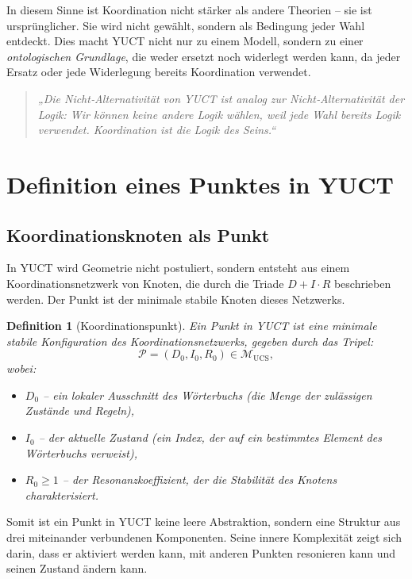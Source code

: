 \documentclass[12pt,a4paper]{article}
\newtheorem{definition}{Definition}
\newcommand{\calP}{\mathcal{P}}
\begin{document}
	In diesem Sinne ist Koordination nicht stärker als andere Theorien – sie ist ursprünglicher. Sie wird nicht gewählt, sondern als Bedingung jeder Wahl entdeckt. Dies macht YUCT nicht nur zu einem Modell, sondern zu einer \emph{ontologischen Grundlage}, die weder ersetzt noch widerlegt werden kann, da jeder Ersatz oder jede Widerlegung bereits Koordination verwendet.
	
	\begin{quote}
		\itshape
		„Die Nicht‑Alternativität von YUCT ist analog zur Nicht‑Alternativität der Logik: Wir können keine andere Logik wählen, weil jede Wahl bereits Logik verwendet. Koordination ist die Logik des Seins.“
	\end{quote}
	
	\section{Definition eines Punktes in YUCT}
	
	\subsection{Koordinationsknoten als Punkt}
	
	In YUCT wird Geometrie nicht postuliert, sondern entsteht aus einem Koordinationsnetzwerk von Knoten, die durch die Triade \(D+I\cdot R\) beschrieben werden. Der Punkt ist der minimale stabile Knoten dieses Netzwerks.
	
	\begin{definition}[Koordinationspunkt]
		Ein Punkt in YUCT ist eine minimale stabile Konfiguration des Koordinationsnetzwerks, gegeben durch das Tripel:
		\[
		\calP = (D_0, I_0, R_0) \in \mathcal{M}_{\mathrm{UCS}},
		\]
		wobei:
		\begin{itemize}
			\item \(D_0\) – ein lokaler Ausschnitt des Wörterbuchs (die Menge der zulässigen Zustände und Regeln),
			\item \(I_0\) – der aktuelle Zustand (ein Index, der auf ein bestimmtes Element des Wörterbuchs verweist),
			\item \(R_0 \ge 1\) – der Resonanzkoeffizient, der die Stabilität des Knotens charakterisiert.
		\end{itemize}
	\end{definition}
	
	Somit ist ein Punkt in YUCT keine leere Abstraktion, sondern eine Struktur aus drei miteinander verbundenen Komponenten. Seine innere Komplexität zeigt sich darin, dass er aktiviert werden kann, mit anderen Punkten resonieren kann und seinen Zustand ändern kann.
	
\end{document}
